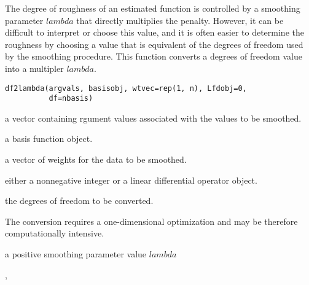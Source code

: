 \begin{Description}\relax
The degree of roughness of an estimated function is controlled by a
smoothing parameter $lambda$ that directly multiplies the penalty.
However, it can be difficult to interpret or choose this value, and it
is often easier to determine the roughness by choosing a value that is
equivalent of the degrees of freedom used by the smoothing procedure.
This function converts a degrees of freedom value into a multipler
$lambda$.
\end{Description}
\begin{Usage}
\begin{verbatim}
df2lambda(argvals, basisobj, wtvec=rep(1, n), Lfdobj=0,
          df=nbasis)
\end{verbatim}
\end{Usage}
\begin{Arguments}
\begin{ldescription}
\item[\code{argvals}] a vector containing rgument values associated with the values to
be smoothed.

\item[\code{basisobj}] a basis function object.

\item[\code{wtvec}] a vector of weights for the data to be smoothed.

\item[\code{Lfdobj}] either a nonnegative integer or a linear differential operator object.

\item[\code{df}] the degrees of freedom to be converted.

\end{ldescription}
\end{Arguments}
\begin{Details}\relax
The conversion requires a one-dimensional optimization and may be
therefore computationally intensive.
\end{Details}
\begin{Value}
a positive smoothing parameter value $lambda$
\end{Value}
\begin{SeeAlso}\relax
{}, 
\end{SeeAlso}
